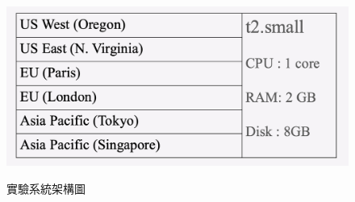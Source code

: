\begin{figure}[h]
{\centering
\includegraphics[scale=0.55]{images/55.png}}
\caption{實驗系統架構圖}
\label{i:byz-latency}
\end{figure}